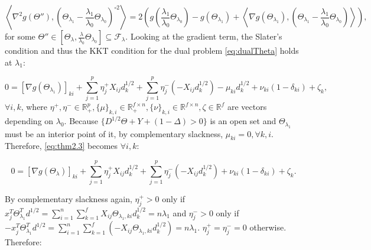 \begin{equation}
    \label{eq:thm2.1}
    \left\langle\nabla^2 g(\Theta''),\left(\Theta_{\lambda_1}-\frac{\lambda_1}{\lambda_0}\Theta_{\lambda_0}\right)^{\circ 2}\right\rangle=2\left(g\left(\frac{\lambda_1}{\lambda_0}\Theta_{\lambda_0}\right)-g(\Theta_{\lambda_1})+\left\langle\nabla g\left(\Theta_{\lambda_1}\right),\left(\Theta_{\lambda_1}-\frac{\lambda_1}{\lambda_0}\Theta_{\lambda_0}\right)\right\rangle\right),
\end{equation}
 for some $\Theta''\in[\Theta_\lambda,\frac{\lambda}{\lambda_0}\Theta_{\lambda_0}]\subseteq \mathcal{F}_\lambda$. Looking at the gradient term, the Slater's condition and thus the KKT condition for the dual problem \eqref{eq:dualTheta} holds at $\lambda_1$:

\begin{equation}
    \label{eq:thm2.3}
    0=[\nabla g(\Theta_{\lambda_1})]_{ki}+\sum_{j=1}^p\eta^+_jX_{ij}d_k^{1/2}+\sum_{j=1}^p\eta^-_j(-X_{ij}d_k^{1/2})-\mu_{ki}d_k^{1/2}+\nu_{ki}(1-\delta_{ki})+\zeta_k,
\end{equation}
$\forall i,k$, where $\eta^+,\eta^-\in\mathbb{R}^p_+,\{\mu\}_{k,i}\in\mathbb{R}^{f\times n}_+,\{\nu\}_{k,i}\in\mathbb{R}^{f\times n},\zeta\in\mathbb{R}^f$ are vectors depending on $\lambda_0$. Because $\{D^{1/2}\Theta+Y+(1-\Delta)>0\}$ is an open set and $\Theta_{\lambda_1}$ must be an interior point of it, by complementary slackness, $\mu_{ki}=0,\forall k,i$. Therefore, \eqref{eq:thm2.3} becomes $\forall i,k$:

\begin{equation}
    \label{eq:thm2.4}
    0=[\nabla g(\Theta_{\lambda})]_{ki}+\sum_{j=1}^p\eta^+_jX_{ij}d_k^{1/2}+\sum_{j=1}^p\eta^-_j(-X_{ij}d_k^{1/2})+\nu_{ki}(1-\delta_{ki})+\zeta_k.
\end{equation}

By complementary slackness again, $\eta^+_j>0$ only if $x_j^T\Theta_{\lambda_1}^Td^{1/2}=\sum_{i=1}^n\sum_{k=1}^fX_{ij}\Theta_{\lambda_1,ki}d_k^{1/2}=n\lambda_1$ and $\eta^-_j>0$ only if $-x_j^T\Theta_{\lambda_1}^Td^{1/2}=\sum_{i=1}^n\sum_{k=1}^f(-X_{ij}\Theta_{\lambda_1,ki}d_k^{1/2})=n\lambda_1$. $\eta^+_j=\eta^-_j=0$ otherwise. Therefore:

